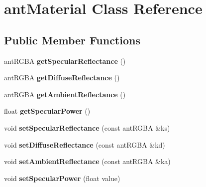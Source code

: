 \hypertarget{classant_material}{\section{ant\+Material Class Reference}
\label{classant_material}
}
\subsection*{Public Member Functions}
\begin{DoxyCompactItemize}
\item 
\hypertarget{classant_material_a39e537bb5b770dc2710b09cdf02c0b16}{ant\+R\+G\+B\+A {\bfseries get\+Specular\+Reflectance} ()}\label{classant_material_a39e537bb5b770dc2710b09cdf02c0b16}

\item 
\hypertarget{classant_material_af4e486230220aba0f2e9d4c1c515aa9d}{ant\+R\+G\+B\+A {\bfseries get\+Diffuse\+Reflectance} ()}\label{classant_material_af4e486230220aba0f2e9d4c1c515aa9d}

\item 
\hypertarget{classant_material_ac075f74d1c1bc402ba655140904fb4fd}{ant\+R\+G\+B\+A {\bfseries get\+Ambient\+Reflectance} ()}\label{classant_material_ac075f74d1c1bc402ba655140904fb4fd}

\item 
\hypertarget{classant_material_a87e7493d467c9e7008395ef5f43c1895}{float {\bfseries get\+Specular\+Power} ()}\label{classant_material_a87e7493d467c9e7008395ef5f43c1895}

\item 
\hypertarget{classant_material_a2a1ab408c41af0f20524bb23dc89b77b}{void {\bfseries set\+Specular\+Reflectance} (const ant\+R\+G\+B\+A \&ks)}\label{classant_material_a2a1ab408c41af0f20524bb23dc89b77b}

\item 
\hypertarget{classant_material_ab52c162fa560d08d8e96d8e0a6eb8045}{void {\bfseries set\+Diffuse\+Reflectance} (const ant\+R\+G\+B\+A \&kd)}\label{classant_material_ab52c162fa560d08d8e96d8e0a6eb8045}

\item 
\hypertarget{classant_material_a2218b9bde119682cb759bf83027c0c8e}{void {\bfseries set\+Ambient\+Reflectance} (const ant\+R\+G\+B\+A \&ka)}\label{classant_material_a2218b9bde119682cb759bf83027c0c8e}

\item 
\hypertarget{classant_material_a52529883db1ad71eb32198062a8f8d43}{void {\bfseries set\+Specular\+Power} (float value)}\label{classant_material_a52529883db1ad71eb32198062a8f8d43}

\end{DoxyCompactItemize}
